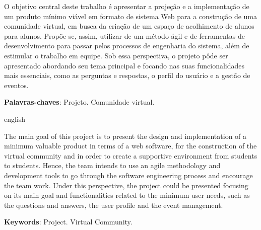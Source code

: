 
\setlength{\absparsep}{18pt} %
\begin{resumo}

O objetivo central deste trabalho é apresentar a projeção e a implementação de um produto mínimo viável em formato de sistema Web para a construção de uma comunidade virtual, em busca da criação de um espaço de acolhimento de alunos para alunos. Propõe-se, assim, utilizar de um método ágil e de ferramentas de desenvolvimento para passar pelos processos de engenharia do sistema, além de estimular o trabalho em equipe. Sob essa perspectiva, o projeto pôde ser apresentado abordando seu tema principal e focando nas suas funcionalidades mais essenciais, como as perguntas e respostas, o perfil do usuário e a gestão de eventos.


\textbf{Palavras-chaves}: Projeto. Comunidade virtual.
\end{resumo}

\begin{resumo}[Abstract]
\begin{otherlanguage*}{english}

The main goal of this project is to present the design and implementation of a minimum valuable product in terms of a web software, for the construction of the virtual community and in order to create a supportive environment from students to students. Hence, the team intends to use an agile methodology and development tools to go through the software engineering process and encourage the team work. Under this perspective, the project could be presented focusing on its main goal and functionalities related to the minimum user needs, such as the questions and answers, the user profile and the event management.

  \vspace{\onelineskip}
  \noindent 
  \textbf{Keywords}: Project. Virtual Community.
 \end{otherlanguage*}
\end{resumo}